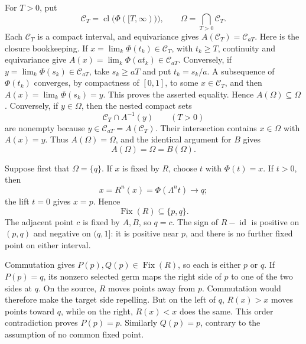 \documentclass[11pt]{article}
\theoremstyle{definition}
\theoremstyle{remark}
\newcommand{\I}{[0,1]}
\newcommand{\Fix}{\operatorname{Fix}}
\newcommand{\id}{\operatorname{id}}
\newcommand{\cl}{\operatorname{cl}}
\begin{document}
For \(T>0\), put
\[
 \mathcal C_T=\cl\bigl(\Phi([T,\infty))\bigr),\qquad
 \Omega=\bigcap_{T>0}\mathcal C_T.
\]
Each \(\mathcal C_T\) is a compact interval, and equivariance gives
\(A(\mathcal C_T)=\mathcal C_{aT}\).  Here is the closure bookkeeping.
If \(x=\lim_k\Phi(t_k)\in\mathcal C_T\), with \(t_k\geq T\), continuity and
equivariance give
\(A(x)=\lim_k\Phi(at_k)\in\mathcal C_{aT}\).  Conversely, if
\(y=\lim_k\Phi(s_k)\in\mathcal C_{aT}\), take \(s_k\geq aT\) and put
\(t_k=s_k/a\).  A subsequence of \(\Phi(t_k)\) converges, by compactness of
\(\I\), to some \(x\in\mathcal C_T\), and then
\(A(x)=\lim_k\Phi(s_k)=y\).  This proves the asserted equality.  Hence
\(A(\Omega)\subseteq\Omega\).  Conversely, if \(y\in\Omega\), then the
nested compact sets
\[
 \mathcal C_T\cap A^{-1}(y)\qquad(T>0)
\]
are nonempty because \(y\in\mathcal C_{aT}=A(\mathcal C_T)\).  Their
intersection contains \(x\in\Omega\) with \(A(x)=y\).  Thus
\(A(\Omega)=\Omega\), and the identical argument for \(B\) gives
\begin{equation}\label{eq:analytic-Omega-invariant}
 A(\Omega)=\Omega=B(\Omega).
\end{equation}

Suppose first that \(\Omega=\{q\}\).  If \(x\) is fixed by \(R\), choose
\(t\) with \(\Phi(t)=x\).  If \(t>0\), then
\[
 x=R^n(x)=\Phi(\Lambda^nt)\longrightarrow q;
\]
the lift \(t=0\) gives \(x=p\).  Hence
\[
 \Fix(R)\subseteq\{p,q\}.
\]
The adjacent point \(c\) is fixed by \(A,B\), so \(q=c\).
The sign of \(R-\id\) is positive on \((p,q)\) and negative on
\((q,1]\): it is positive near \(p\), and there is no further fixed point
on either interval.

Commutation gives \(P(p),Q(p)\in\Fix(R)\), so each is either \(p\) or \(q\).
If \(P(p)=q\), its nonzero selected germ maps the right side of \(p\) to one
of the two sides at \(q\).  On the source, \(R\) moves points away from \(p\).
Commutation would therefore make the target side repelling.  But on the left
of \(q\), \(R(x)>x\) moves points toward \(q\), while on the right,
\(R(x)<x\) does the same.  This order contradiction proves \(P(p)=p\).
Similarly \(Q(p)=p\), contrary to the assumption of no common fixed point.
\end{document}
